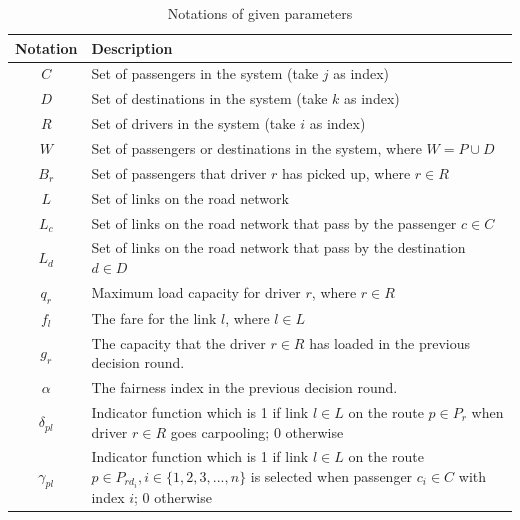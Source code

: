 \renewcommand\arraystretch{1.5}
\par
\begin{table}[ht]
  \centering
  \caption{Notations of given parameters}
  \begin{tabularx}{\textwidth}{cX}
  \toprule
  Notation & Description \\
  \midrule
    $C$ & Set of passengers in the system (take $j$ as index) \\
    $D$ & Set of destinations in the system (take $k$ as index) \\
    $R$ & Set of drivers in the system (take $i$ as index) \\
    $W$ & Set of passengers or destinations in the system, where $W = P \cup D$ \\
    $B_r$ & Set of passengers that driver $r$ has picked up, where $r \in R$ \\
    $L$ & Set of links on the road network \\
    $L_c$ & Set of links on the road network that pass by the passenger $c \in C$ \\
    $L_d$ & Set of links on the road network that pass by the destination $d \in D$ \\
    $q_r$ & Maximum load capacity for driver $r$, where $r \in R$ \\
    $f_l$ & The fare for the link $l$, where $l \in L$ \\
    $g_r$ & The capacity that the driver $r \in R$ has loaded in the previous decision round. \\
    $\alpha$ & The fairness index in the previous decision round. \\
    $\delta_{pl}$ & Indicator function which is 1 if link $l \in L$ on the route $p \in P_r$ when driver $r \in R$ goes carpooling; 0 otherwise \\
    $\gamma_{pl}$ & Indicator function which is 1 if link $l \in L$ on the route $p \in P_{rd_i}, i \in \{1,2,3,...,n\}$ is selected when passenger $c_i \in C$ with index $i$; 0 otherwise \\
  \bottomrule
  \end{tabularx}
\end{table}  
\par

